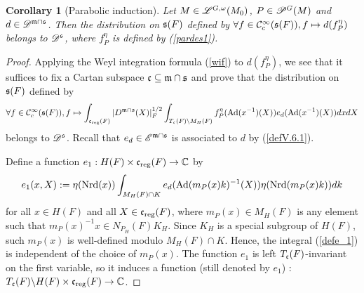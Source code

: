 \documentclass[a4paper]{amsart}
\newcommand{\mse}{\mathscr{E}}\newcommand{\msf}{\mathscr{F}}\newcommand{\msg}{\mathscr{G}}\newcommand{\msh}{\mathscr{H}}
\newcommand{\fm}{{\mathfrak{m}}} \newcommand{\fn}{{\mathfrak{n}}}\newcommand{\fo}{{\mathfrak{o}}} \newcommand{\fp}{{\mathfrak{p}}}
\newtheorem{coro}[thm]{Corollary}
\theoremstyle{definition}
\theoremstyle{remark}
\numberwithin{equation}{subsection}
\begin{document}
\begin{coro}[Parabolic induction]\label{corV.8.1}
Let $M\in\mathscr{L}^{G,\omega}(M_0)$, $P\in\mathscr{P}^G(M)$ and $d\in\msd^{\fm\cap\fs}$. Then the distribution on ${\mathfrak{s}}(F)$ defined by $\forall f\in{\mathcal {C}}_c^\infty({\mathfrak{s}}(F)), f\mapsto d(f_P^\eta)$ belongs to $\mathscr{D}^{\mathfrak{s}}$, where $f_P^\eta$ is defined by (\ref{pardes1}). 
\end{coro}

\begin{proof}
Applying the Weyl integration formula (\ref{wif}) to $d(f_P^\eta)$, we see that it suffices to fix a Cartan subspace $\fc\subseteq\fm\cap\fs$ and prove that the distribution on ${\mathfrak{s}}(F)$ defined by
\begin{equation}\label{equ0corV.8}
 \forall f\in\CC_c^\infty(\fs(F)), f\mapsto \int_{\fc_\reg(F)} |D^{\fm\cap\fs}(X)|_F^{1/2} \int_{T_\fc(F)\bs M_H(F)} f_P^\eta(\Ad(x^{-1})(X)) e_d(\Ad(x^{-1})(X)) dx dX 
\end{equation}
belongs to $\mathscr{D}^{\mathfrak{s}}$. Recall that $e_d\in\mse^{\fm\cap\fs}$ is associated to $d$ by (\ref{defV.6.1}). 

Define a function $e_1: H(F)\times{\mathfrak{c}}_{\mathrm{reg}}(F)\rightarrow{\mathbb {C}}$ by
\begin{equation}\label{defe_1}
 e_1(x,X):=\eta({\mathrm{Nrd}}(x))\int_{M_H(F)\cap K} e_d({\mathrm{Ad}}(m_P(x)k)^{-1}(X)) \eta({\mathrm{Nrd}}(m_P(x)k)) dk 
\end{equation}
for all $x\in H(F)$ and all $X\in{\mathfrak{c}}_{\mathrm{reg}}(F)$, where $m_P(x)\in M_H(F)$ is any element such that $m_P(x)^{-1}x\in N_{P_H}(F)K_H$. 
Since $K_H$ is a special subgroup of $H(F)$, such $m_P(x)$ is well-defined modulo $M_H(F)\cap K$. Hence, the integral (\ref{defe_1}) is independent of the choice of $m_P(x)$. 
The function $e_1$ is left $T_{\mathfrak{c}}(F)$-invariant on the first variable, so it induces a function (still denoted by $e_1$) : $T_{\mathfrak{c}}(F)\backslash H(F)\times{\mathfrak{c}}_{\mathrm{reg}}(F)\rightarrow{\mathbb {C}}$. 


\end{proof}
\end{document}
